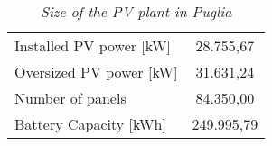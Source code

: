 \begin{table}[h]
\centering
\begin{tabular}{|l|c|}
\hline
\rowcolor{bluepoli!40}\multicolumn{2}{|c|}{\cellcolor{bluepoli!40}\textbf{PV Plant Sizing}} \\ \hline
Installed PV   power [kW] & 28.755,67    \\ \hline
Oversized PV   power [kW] & 31.631,24    \\ \hline
Number of   panels        & 84.350,00   \\ \hline
Battery Capacity [kWh]    & 249.995,79  \\ \hline
\end{tabular}
\caption{\textit{Size of the PV plant in Puglia}}
\label{tab:pvpuglisize}
\end{table}